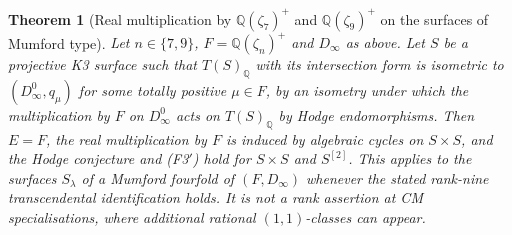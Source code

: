 \documentclass[11pt,reqno]{amsart}
\numberwithin{equation}{section}
\theoremstyle{plain}
\newtheorem{theorem}{Theorem}[section]
\theoremstyle{definition}
\newcommand{\QQ}{\mathbb{Q}}
\newcommand{\Fiii}{\texorpdfstring{\textup{(F3$'$)}}{(F3')}}
\begin{document}
\begin{theorem}[Real multiplication by $\QQ(\zeta_{7})^{+}$ and $\QQ(\zeta_{9})^{+}$ on the surfaces of Mumford type]\label{thm:zeta9}
Let $n\in\{7,9\}$, $F=\QQ(\zeta_{n})^{+}$ and $D_{\infty}$ as above. Let $S$ be a projective K3 surface such that $T(S)_{\QQ}$ with its intersection form is isometric to $(D_{\infty}^{0},q_{\mu})$ for some totally positive $\mu\in F$, by an isometry under which the multiplication by $F$ on $D_{\infty}^{0}$ acts on $T(S)_{\QQ}$ by Hodge endomorphisms. Then $E=F$, the real multiplication by $F$ is induced by algebraic cycles on $S\times S$, and the Hodge conjecture and \Fiii{} hold for $S\times S$ and $S^{[2]}$. This applies to the surfaces $S_{\lambda}$ of a Mumford fourfold of $(F,D_{\infty})$ whenever the stated rank-nine transcendental identification holds. It is not a rank assertion at CM specialisations, where additional rational $(1,1)$-classes can appear.
\end{theorem}
\end{document}
